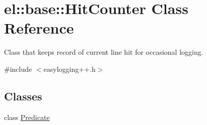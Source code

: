 \hypertarget{classel_1_1base_1_1_hit_counter}{}\section{el\+:\+:base\+:\+:Hit\+Counter Class Reference}
\label{classel_1_1base_1_1_hit_counter}


Class that keeps record of current line hit for occasional logging.  




{\ttfamily \#include $<$easylogging++.\+h$>$}

\subsection*{Classes}
\begin{DoxyCompactItemize}
\item 
class \hyperlink{classel_1_1base_1_1_hit_counter_1_1_predicate}{Predicate}
\end{DoxyCompactItemize}
